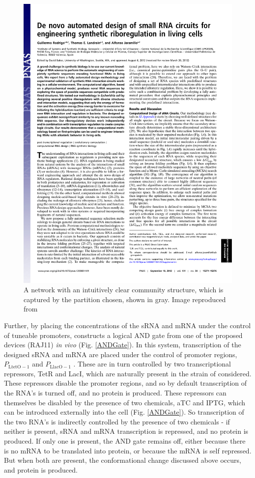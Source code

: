 \documentclass[10pt,journal]{./IEEE_latex_class/IEEEtran}
\begin{document}
\begin{figure}[H]
\centering
\includegraphics[trim = 60 630 300 30,page=2,clip = true]{pnas1203831109.pdf}
\caption{A network with an intuitively clear community structure, which is captured by the partition chosen, shown in gray. Image reproduced from \cite{Rodrigo2012}}
\label{reactionscheme}
\end{figure}


Further, by placing the concentrations of the sRNA and mRNA under the control of tuneable promoters, \cite{Rodrigo2012} constructs a logical AND gate from one of the proposed devices (RAJ11) \textit{in vivo} (Fig. \ref{ANDGate}). In this system, transcription of the designed sRNA and mRNA are placed under the control of promoter regions, $P_{\mathrm{LtetO-1}}$ and $P_\mathrm{LlacO-1}$ \cite{Lutz1997}. These are in turn controlled by two transcriptional repressors, TetR and LacI, which are naturally present in the strain of  considered. These repressors disable the promoter regions, and so by default transcription of the RNA's is turned off, and no protein is produced. 
These repressors can themselves be disabled by the presence of two chemicals, aTC and IPTG, which can be introduced externally into the cell (Fig. \ref{ANDGate}).  So transcription of the two RNA's is indirectly controlled by the presence of two chemicals - if neither is present, sRNA and mRNA transcription is repressed, and no protein is produced. If only one is present, the AND gate remains off, either because there is no mRNA to be translated into protein, or because the mRNA is self repressed. But when both are present, the conformational change discussed above occurs, and protein is produced.
\end{document}
